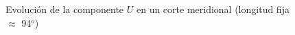 \begin{figure}[!ht]
\centering
  \hfill{}\hfill
  \hfill

  \hfill{}\hfill
  \hfill
  \caption{Evoluci\'on de la componente $U$ en un corte meridional (longitud fija $\approx$ 94$^o$)}%
\label{fig:uno}
\end{figure}
